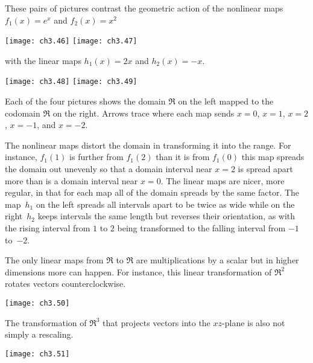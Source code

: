 These pairs of pictures contrast the geometric action of the nonlinear maps
\( f_1(x)=e^x \) and \( f_2(x)=x^2 \) 
\begin{center}
  \texttt{[image: ch3.46]}
  \hspace*{4em}
  \texttt{[image: ch3.47]}
\end{center}
with the linear maps
\( h_1(x)=2x \) and \( h_2(x)=-x \).
\begin{center}
  \texttt{[image: ch3.48]}
  \hspace*{4em}
  \texttt{[image: ch3.49]}
\end{center}
Each of the four pictures shows the domain $\Re$ on the left 
mapped to the codomain $\Re$ on the right. 
Arrows trace where each map sends
$x=0$, $x=1$, $x=2$, $x=-1$, and $x=-2$.

The nonlinear maps distort
the domain in transforming it into the range.
For instance,
\( f_1(1) \) is further from
$f_1(2)$ than it is from $f_1(0)$ \Dash  this map spreads
the domain out unevenly so that a domain interval near $x=2$ is 
spread apart more 
than is a domain interval near $x=0$.
The linear maps are nicer, more regular, 
in that for each map all of the domain 
spreads by the same factor.
The map~$h_1$ on the left spreads all intervals apart to be twice as wide 
while on the right~$h_2$ keeps intervals the same length but reverses
their orientation, as with the rising interval from $1$ to $2$ 
being transformed 
to the falling interval from $-1$ to~$-2$.

The only linear maps from $\Re$ to $\Re$ are multiplications by a scalar but
in higher dimensions more can happen. 
For instance, this linear transformation of $\Re^2$
rotates vectors counterclockwise.
\begin{center}
  \texttt{[image: ch3.50]}
\end{center}
The transformation of $\Re^3$ 
that projects vectors into the $xz$-plane
is also not simply a rescaling.
\begin{center}
 \texttt{[image: ch3.51]}
\end{center}

